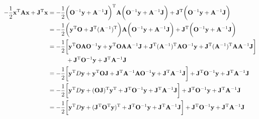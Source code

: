 \documentclass{homework}
\begin{document}
\begin{itemize}
\begin{equation}
    \begin{split}
        -\frac{1}{2} {{\bf x}}^{\textnormal{T}} {{\bf A}} {{\bf x}} + {{\bf J}}^{\textnormal{T}} {{\bf x}} &= -\frac{1}{2} \bigg({\bf O}^{-1} {\bf y} + {\bf A}^{-1} {\bf J}\bigg)^{\textnormal{T}} {{\bf A}} \bigg({\bf O}^{-1} {\bf y} + {\bf A}^{-1} {\bf J}\bigg) + {{\bf J}}^{\textnormal{T}} \bigg({\bf O}^{-1} {\bf y} + {\bf A}^{-1} {\bf J}\bigg) \\
        &= -\frac{1}{2} \bigg(
        {\bf y}^{\textnormal{T}} {\bf O} + 
        {\bf J}^{\textnormal{T}} ({\bf A}^{-1})^{\textnormal{T}} \bigg){{\bf A}} \bigg({\bf O}^{-1} {\bf y} + {\bf A}^{-1} {\bf J}\bigg) + {{\bf J}}^{\textnormal{T}} \bigg({\bf O}^{-1} {\bf y} + {\bf A}^{-1} {\bf J}\bigg) \\
        &= - \frac{1}{2} \bigg[ {\bf y}^{\textnormal{T}} {\bf O} {\bf A} {\bf O}^{-1} {\bf y} + {\bf y}^{\textnormal{T}} {\bf O} {\bf A} {\bf A}^{-1} {\bf J} +  {\bf J}^{\textnormal{T}} ({\bf A}^{-1})^{\textnormal{T}} {\bf A} {\bf O}^{-1} {\bf y} +  {\bf J}^{\textnormal{T}} ({\bf A}^{-1})^{\textnormal{T}} {\bf A} {\bf A}^{-1} {\bf J} \bigg] \\
        & \blanky \blanky \blanky \blanky \blanky \blanky \blanky \blanky \blanky + {{\bf J}}^{\textnormal{T}} {\bf O}^{-1} {\bf y} + {{\bf J}}^{\textnormal{T}} {\bf A}^{-1} {\bf J} \\
        &= - \frac{1}{2} \bigg[ {\bf y}^{\textnormal{T}} D {\bf y} + {\bf y}^{\textnormal{T}} {\bf O} {\bf J} + {\bf J}^{\textnormal{T}} {\bf A}^{-1} {\bf A} {\bf O}^{-1} {\bf y} +  {\bf J}^{\textnormal{T}} {\bf A}^{-1} {\bf J} \bigg] + {{\bf J}}^{\textnormal{T}} {\bf O}^{-1} {\bf y} + {{\bf J}}^{\textnormal{T}} {\bf A}^{-1} {\bf J} \\
        &= - \frac{1}{2} \bigg[ {\bf y}^{\textnormal{T}} D {\bf y} + ({\bf O} {\bf J})^{\textnormal{T}}{\bf y}^{\textnormal{T}} + {\bf J}^{\textnormal{T}} {\bf O}^{-1} {\bf y} +  {\bf J}^{\textnormal{T}} {\bf A}^{-1} {\bf J} \bigg] + {{\bf J}}^{\textnormal{T}} {\bf O}^{-1} {\bf y} + {{\bf J}}^{\textnormal{T}} {\bf A}^{-1} {\bf J} \\
        &= - \frac{1}{2} \bigg[ {\bf y}^{\textnormal{T}} D {\bf y} + ({\bf J}^{\textnormal{T}}{\bf O}^{\textnormal{T}} {\bf y})^{\textnormal{T}} + {\bf J}^{\textnormal{T}} {\bf O}^{-1} {\bf y} +  {\bf J}^{\textnormal{T}} {\bf A}^{-1} {\bf J} \bigg] + {{\bf J}}^{\textnormal{T}} {\bf O}^{-1} {\bf y} + {{\bf J}}^{\textnormal{T}} {\bf A}^{-1} {\bf J} \\

\end{split}
\end{equation}
\end{itemize}
\end{document}
